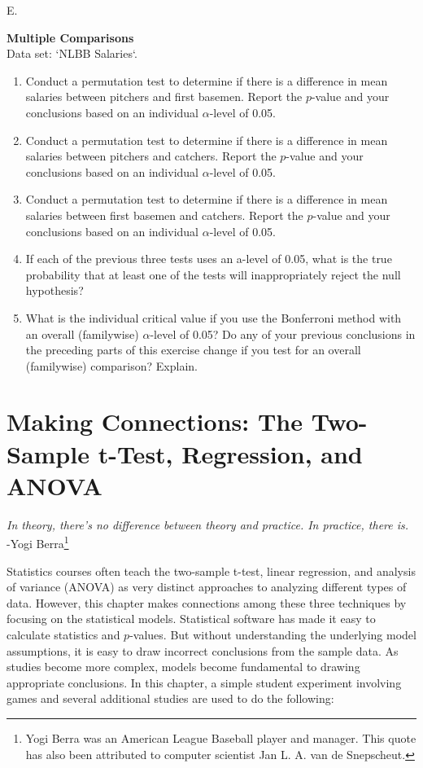 \documentclass[
]{report}
\newcounter{excount}
\renewcommand{\theexcount}{E\arabic{excount}}
\begin{document}
\begin{list}{\theexcount.}{ \setlength{\itemsep}{0.5em}}
  
  \item \textbf{Multiple Comparisons} \\
  Data set: `NLBB Salaries`. 
  \begin{enumerate}
    \setcounter{enumi}{0}  
    \item Conduct a permutation test to determine if there is a difference in mean salaries between pitchers and first basemen. Report the $p$-value and your conclusions based on an individual $\alpha$-level of 0.05.
    \item Conduct a permutation test to determine if there is a difference in mean salaries between pitchers and catchers. Report the $p$-value and your conclusions based on an individual $\alpha$-level of 0.05.
    \item Conduct a permutation test to determine if there is a difference in mean salaries between first basemen and catchers. Report the $p$-value and your conclusions based on an individual $\alpha$-level of 0.05.
    \item If each of the previous three tests uses an a-level of 0.05, what is the true probability that at least one of the tests will inappropriately reject the null hypothesis?
    \item What is the individual critical value if you use the Bonferroni method with an overall (familywise) $\alpha$-level of 0.05? Do any of your previous conclusions in the preceding parts of this exercise change if you test for an overall (familywise) comparison? Explain.
  \end{enumerate}
  
  
  
  
\end{list}

\hypertarget{making-connections-the-two-sample-t-test-regression-and-anova}{%
\chapter{Making Connections: The Two-Sample t-Test, Regression, and ANOVA}\label{making-connections-the-two-sample-t-test-regression-and-anova}}

{ \emph{In theory, there's no difference between theory and practice. In practice, there is.}}\\
{ -Yogi Berra\footnote{Yogi Berra was an American League Baseball player and manager. This quote has also been attributed to computer scientist Jan L. A. van de Snepscheut.}
}

Statistics courses often teach the two-sample t-test, linear regression, and analysis of variance (ANOVA) as very distinct approaches to analyzing different types of data. However, this chapter makes connections among these three techniques by focusing on the statistical models. Statistical software has made it easy to calculate statistics and \(p\)-values. But without understanding the underlying model assumptions, it is easy to draw incorrect conclusions from the sample data. As studies become more complex, models become fundamental to drawing appropriate conclusions. In this chapter, a simple student experiment involving games and several additional studies are used to do the following:
\end{document}

